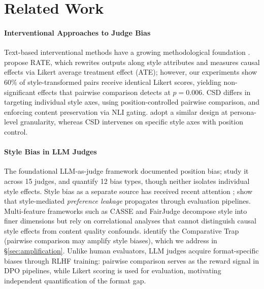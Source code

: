 \section{Related Work}
\label{sec:related_work}

\paragraph{Interventional Approaches to Judge Bias}
Text-based interventional methods have a growing methodological foundation \citep{feder2021causalm,wu2021polyjuice,feder2022causal}.
\citet{reber2025rate} propose RATE, which rewrites outputs along style attributes and measures causal effects via Likert average treatment effect (ATE); however, our experiments show 60\% of style-transformed pairs receive identical Likert scores, yielding non-significant effects that pairwise comparison detects at $p = 0.006$.
CSD differs in targeting individual style axes, using position-controlled pairwise comparison, and enforcing content preservation via NLI gating.
\citet{counterfactual2025rhetorical} adopt a similar design at persona-level granularity, whereas CSD intervenes on specific style axes with position control.

\paragraph{Style Bias in LLM Judges}
The foundational LLM-as-judge framework \citep{zheng2023judging} documented position bias; \citet{shi2024judging} study it across 15 judges, and \citet{ye2024justice} quantify 12 bias types, though neither isolates individual style effects.
Style bias as a separate source has received recent attention \citep{wu2023style,murugadoss2025sos,saito2023verbosity,li2026preference,soumik2026judging}; \citet{li2026preference} show that style-mediated \emph{preference leakage} propagates through evaluation pipelines.
Multi-feature frameworks such as CASSE \citep{casse2026concise} and FairJudge \citep{wang2026fairjudge} decompose style into finer dimensions but rely on correlational analyses that cannot distinguish causal style effects from content quality confounds.
\citet{jeong2025comparative} identify the Comparative Trap (pairwise comparison may amplify style biases), which we address in \S\ref{sec:amplification}.
Unlike human evaluators, LLM judges acquire format-specific biases through RLHF training: pairwise comparison serves as the reward signal in DPO pipelines, while Likert scoring is used for evaluation, motivating independent quantification of the format gap.

